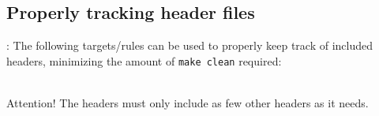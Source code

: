 
\subsection{Properly tracking header files}
\begin{frame}{\secname: \small\subsecname\normalsize}
	The following targets/rules can be used to properly keep track of included headers, minimizing the amount of \texttt{make clean} required: \\~\\

	\makeHeaders

    \begin{alertblock}{Attention!}
        The headers must only include as few other headers as it needs.
    \end{alertblock}
\end{frame}
